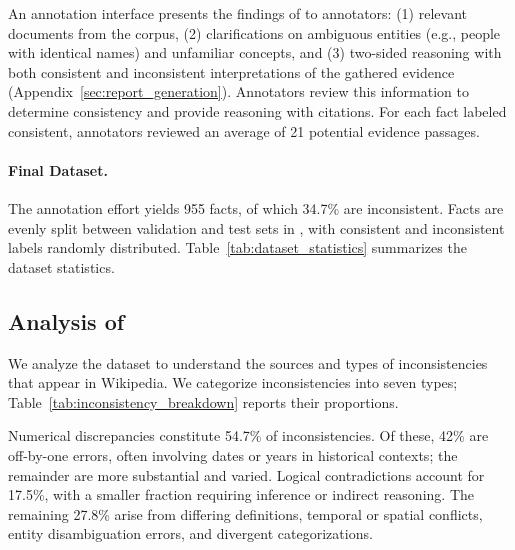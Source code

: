 An annotation interface presents the findings of \system to annotators: (1) relevant documents from the corpus, (2) clarifications on ambiguous entities (e.g., people with identical names) and unfamiliar concepts, and (3) two-sided reasoning with both consistent and inconsistent interpretations of the gathered evidence (Appendix~\ref{sec:report_generation}). Annotators review this information to determine consistency and provide reasoning with citations. For each fact labeled consistent, annotators reviewed an average of 21 potential evidence passages.

\paragraph{Final Dataset.} The annotation effort yields 955 facts, of which 34.7\% are inconsistent. Facts are evenly split between validation and test sets in \dataset, with consistent and inconsistent labels randomly distributed. Table~\ref{tab:dataset_statistics} summarizes the dataset statistics.

\subsection{Analysis of \dataset}

We analyze the dataset to understand the sources and types of inconsistencies that appear in Wikipedia. We categorize inconsistencies into seven types; Table~\ref{tab:inconsistency_breakdown} reports their proportions.

Numerical discrepancies constitute 54.7\% of inconsistencies. Of these, 42\% are off-by-one errors, often involving dates or years in historical contexts; the remainder are more substantial and varied. Logical contradictions account for 17.5\%, with a smaller fraction requiring inference or indirect reasoning. The remaining 27.8\% arise from differing definitions, temporal or spatial conflicts, entity disambiguation errors, and divergent categorizations.















